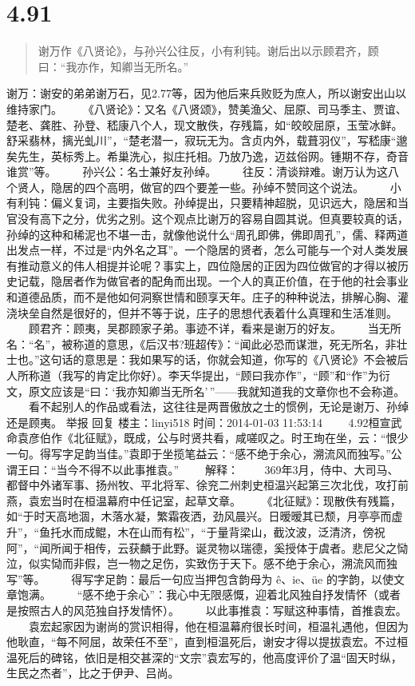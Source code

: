\documentclass[]{book}
\begin{document}
\section{4.91}\label{section-268}

\begin{quote}
谢万作《八贤论》，与孙兴公往反，小有利钝。谢后出以示顾君齐，顾曰：``我亦作，知卿当无所名。''
\end{quote}

谢万：谢安的弟弟谢万石，见2.77等，因为他后来兵败贬为庶人，所以谢安出山以维持家门。
　　《八贤论》：又名《八贤颂》，赞美渔父、屈原、司马季主、贾谊、楚老、龚胜、孙登、嵇康八个人，现文散佚，存残篇，如``皎皎屈原，玉莹冰鲜。舒采翡林，摛光虬川''，``楚老潜一，寂玩无为。含贞内外，载葺羽仪''，写嵇康``邈矣先生，英标秀上。希巢洗心，拟庄托相。乃放乃逸，迈兹俗网。锺期不存，奇音谁赏''等。
　　孙兴公：名士兼好友孙绰。
　　往反：清谈辩难。谢万认为这八个贤人，隐居的四个高明，做官的四个要差一些。孙绰不赞同这个说法。
　　小有利钝：偏义复词，主要指失败。孙绰提出，只要精神超脱，见识远大，隐居和当官没有高下之分，优劣之别。这个观点比谢万的容易自圆其说。但真要较真的话，孙绰的这种和稀泥也不堪一击，就像他说什么``周孔即佛，佛即周孔''，儒、释两道出发点一样，不过是``内外名之耳''。一个隐居的贤者，怎么可能与一个对人类发展有推动意义的伟人相提并论呢？事实上，四位隐居的正因为四位做官的才得以被历史记载，隐居者作为做官者的配角而出现。一个人的真正价值，在于他的社会事业和道德品质，而不是他如何洞察世情和颐享天年。庄子的种种说法，排解心胸、灌浇块垒自然是很好的，但并不等于说，庄子的思想代表着什么真理和生活准则。
　　顾君齐：顾夷，吴郡顾家子弟。事迹不详，看来是谢万的好友。
　　当无所名：``名''，被称道的意思，《后汉书?班超传》：``闻此必恐而谋泄，死无所名，非壮士也。''这句话的意思是：我如果写的话，你就会知道，你写的《八贤论》不会被后人所称道（我写的肯定比你好）。李天华提出，``顾曰我亦作''，``顾''和``作''为衍文，原文应该是``曰：`我亦知卿当无所名'\,''------我就知道我的文章你也不会称道。
　　看不起别人的作品或看法，这往往是两晋傲放之士的惯例，无论是谢万、孙绰还是顾夷。
举报 回复 楼主：linyi518 时间：2014-01-03 11:53:14
　　4.92桓宣武命袁彦伯作《北征赋》，既成，公与时贤共看，咸嗟叹之。时王珣在坐，云：``恨少一句。得写字足韵当佳。''袁即于坐揽笔益云：``感不绝于余心，溯流风而独写。''公谓王曰：``当今不得不以此事推袁。''
　　解释：
　　369年3月，侍中、大司马、都督中外诸军事、扬州牧、平北将军、徐兖二州刺史桓温兴起第三次北伐，攻打前燕，袁宏当时在桓温幕府中任记室，起草文章。
　　《北征赋》：现散佚有残篇，如``于时天高地涸，木落水凝，繁霜夜洒，劲风晨兴。日暧暧其已颓，月亭亭而虚升''，``鱼托水而成鲲，木在山而有松''，``于量背梁山，截汶波，泛清济，傍祝阿''，``闻所闻于相传，云获麟于此野。诞灵物以瑞德，奚授体于虞者。悲尼父之恸泣，似实恸而非假，岂一物之足伤，实致伤于天下。感不绝于余心，溯流风而独写''等。
　　得写字足韵：最后一句应当押包含韵母为 ê、ie、üe
的字韵，以使文章饱满。
　　``感不绝于余心''：我心中无限感慨，迎着北风独自抒发情怀（或者是按照古人的风范独自抒发情怀）。
　　以此事推袁：写赋这种事情，首推袁宏。
　　袁宏起家因为谢尚的赏识相得，他在桓温幕府很长时间，桓温礼遇他，但因为他耿直，``每不阿屈，故荣任不至''，直到桓温死后，谢安才得以提拔袁宏。不过桓温死后的碑铭，依旧是相交甚深的``文宗''袁宏写的，他高度评价了温``固天时纵，生民之杰者''，比之于伊尹、吕尚。
\end{document}
